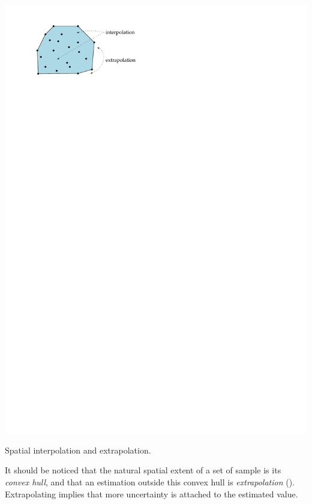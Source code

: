 \begin{marginfigure}
  \centering
  \includegraphics{figs/extrapolation}
  \caption{Spatial interpolation and extrapolation.}%
\end{marginfigure}
It should be noticed that the natural spatial extent of a set of sample is its \emph{convex hull}, and that an estimation outside this convex hull is \emph{extrapolation} ().
Extrapolating implies that more uncertainty is attached to the estimated value.

%

